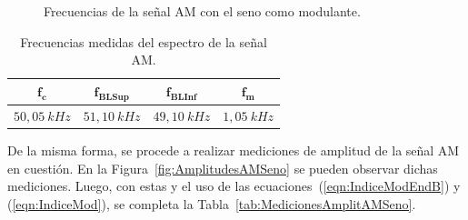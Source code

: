 \begin{figure}[H]
        \caption{Frecuencias de la señal AM con el seno como modulante.}
        \label{fig:FreqAMSeno}
      \end{figure}

      \begin{table}[H]
        \centering
      \begin{tabular}{cccc} \hline \hline
          $\mathbf{f_c} $        &   $\mathbf{f_{BLSup}}$   &   $\mathbf{f_{BLInf}}$    &   $\mathbf{f_m}$  \\ \hline
          $50,05~kHz$   &   $51,10~kHz$   &    $49,10~kHz$   &   $1,05~kHz$   \\ \hline \hline
        \end{tabular}
        \caption{Frecuencias medidas del espectro de la señal AM.}
        \label{tab:MedicionesFreqAMSeno}
      \end{table}

      De la misma forma, se procede a realizar mediciones de amplitud de la señal AM en cuestión. En la
      Figura~\ref{fig:AmplitudesAMSeno} se pueden observar dichas mediciones. Luego, con estas y 
      el uso de las ecuaciones~(\ref{eqn:IndiceModEndB}) y (\ref{eqn:IndiceMod}), se completa la 
      Tabla~\ref{tab:MedicionesAmplitAMSeno}.

